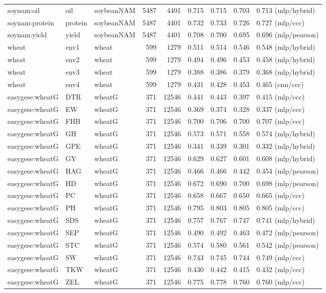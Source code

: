 \begin{longtable}{@{}p{2.25cm}p{1.35cm}p{1.85cm}rrcccp{2.7cm}@{}}
soynam:oil & oil & soybeanNAM & 5487 & 4401 & 0.715 & 0.715 & 0.703 & 0.713 (mlp/hybrid) \\
soynam:protein & protein & soybeanNAM & 5487 & 4401 & 0.732 & 0.733 & 0.726 & 0.727 (mlp/ccc) \\
soynam:yield & yield & soybeanNAM & 5487 & 4401 & 0.708 & 0.700 & 0.695 & 0.696 (mlp/pearson) \\
wheat & env1 & wheat & 599 & 1279 & 0.511 & 0.514 & 0.546 & 0.548 (mlp/hybrid) \\
wheat & env2 & wheat & 599 & 1279 & 0.494 & 0.496 & 0.453 & 0.458 (mlp/hybrid) \\
wheat & env3 & wheat & 599 & 1279 & 0.388 & 0.386 & 0.379 & 0.368 (mlp/hybrid) \\
wheat & env4 & wheat & 599 & 1279 & 0.431 & 0.428 & 0.453 & 0.465 (cnn/ccc) \\
easygese:wheatG & DTR & wheatG & 371 & 12546 & 0.441 & 0.443 & 0.397 & 0.415 (mlp/ccc) \\
easygese:wheatG & EW & wheatG & 371 & 12546 & 0.369 & 0.374 & 0.328 & 0.337 (mlp/ccc) \\
easygese:wheatG & FHB & wheatG & 371 & 12546 & 0.700 & 0.706 & 0.700 & 0.707 (mlp/ccc) \\
easygese:wheatG & GH & wheatG & 371 & 12546 & 0.573 & 0.571 & 0.558 & 0.574 (mlp/hybrid) \\
easygese:wheatG & GPE & wheatG & 371 & 12546 & 0.341 & 0.339 & 0.301 & 0.332 (mlp/hybrid) \\
easygese:wheatG & GY & wheatG & 371 & 12546 & 0.629 & 0.627 & 0.601 & 0.608 (mlp/hybrid) \\
easygese:wheatG & HAG & wheatG & 371 & 12546 & 0.466 & 0.466 & 0.442 & 0.454 (mlp/pearson) \\
easygese:wheatG & HD & wheatG & 371 & 12546 & 0.672 & 0.690 & 0.700 & 0.698 (mlp/pearson) \\
easygese:wheatG & PC & wheatG & 371 & 12546 & 0.658 & 0.667 & 0.650 & 0.665 (mlp/ccc) \\
easygese:wheatG & PH & wheatG & 371 & 12546 & 0.795 & 0.803 & 0.805 & 0.805 (mlp/ccc) \\
easygese:wheatG & SDS & wheatG & 371 & 12546 & 0.757 & 0.767 & 0.747 & 0.741 (mlp/hybrid) \\
easygese:wheatG & SEP & wheatG & 371 & 12546 & 0.490 & 0.492 & 0.463 & 0.472 (mlp/pearson) \\
easygese:wheatG & STC & wheatG & 371 & 12546 & 0.574 & 0.580 & 0.561 & 0.542 (mlp/pearson) \\
easygese:wheatG & SW & wheatG & 371 & 12546 & 0.743 & 0.745 & 0.744 & 0.749 (mlp/ccc) \\
easygese:wheatG & TKW & wheatG & 371 & 12546 & 0.430 & 0.442 & 0.415 & 0.432 (mlp/ccc) \\
easygese:wheatG & ZEL & wheatG & 371 & 12546 & 0.775 & 0.778 & 0.760 & 0.760 (mlp/ccc) \\
\end{longtable}
